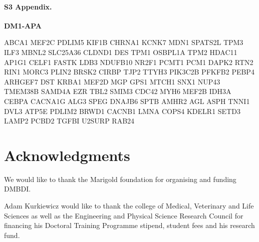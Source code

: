 \documentclass[10pt,letterpaper]{article}
\begin{document}
\paragraph*{S3 Appendix.}
\label{Appendix2}
{\bf DM1-APA}

ABCA1 MEF2C PDLIM5 KIF1B CHRNA1 KCNK7 MDN1 SPATS2L TPM3 ILF3 MBNL2 SLC25A36 CLDND1 DES TPM1 OSBPL1A TPM2 HDAC11 AP1G1 CELF1 FASTK LDB3 NDUFB10 NR2F1 PCMT1 PCM1 DAPK2 RTN2 RIN1 MORC3 PLIN2 BRSK2 CIRBP TJP2 TTYH3 PIK3C2B PFKFB2 PEBP4 ARHGEF7 DST KRBA1 MEF2D MGP GPS1 MTCH1 SNX1 NUP43 TMEM38B SAMD4A EZR TBL2 SMIM3 CDC42 MYH6 MEF2B IDH3A CEBPA CACNA1G ALG3 SPEG DNAJB6 SPTB AMHR2 AGL ASPH TNNI1 DVL3 ATP5E PDLIM2 BRWD1 CACNB1 LMNA COPS4 KDELR1 SETD3 LAMP2 PCBD2 TGFBI U2SURP RAB24



\section*{Acknowledgments}
We would like to thank the Marigold foundation for organising and funding DMBDI.

Adam Kurkiewicz would like to thank the college of Medical, Veterinary and Life Sciences as well as the Engineering and Physical Science Research Council for financing his Doctoral Training Programme stipend, student fees and his research fund.

\nolinenumbers

%
%
% 




\end{document}
